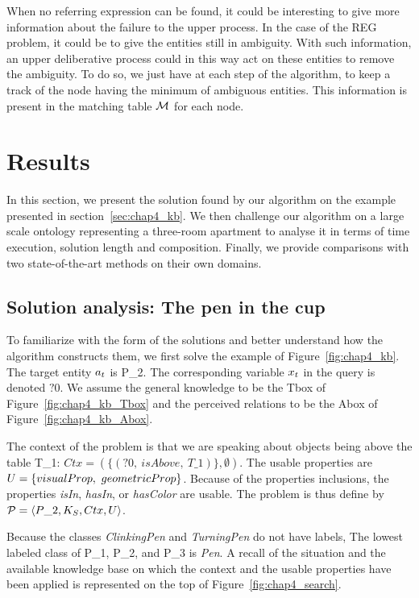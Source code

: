 When no referring expression can be found, it could be interesting to give more information about the failure to the upper process. In the case of the REG problem, it could be to give the entities still in ambiguity. With such information, an upper deliberative process could in this way act on these entities to remove the ambiguity. To do so, we just have at each step of the algorithm, to keep a track of the node having the minimum of ambiguous entities. This information is present in the matching table $\mathcal{M}$ for each node.

\section{Results}

In this section, we present the solution found by our algorithm on the example presented in section~\ref{sec:chap4_kb}. We then challenge our algorithm on a large scale ontology representing a three-room apartment to analyse it in terms of time execution, solution length and composition. Finally, we provide comparisons with two state-of-the-art methods on their own domains.

\subsection{Solution analysis: The pen in the cup}

To familiarize with the form of the solutions and better understand how the algorithm constructs them, we first solve the example of Figure~\ref{fig:chap4_kb}. The target entity $a_t$ is P\_2. The corresponding variable $x_t$ in the \sparql{} query is denoted $?0$. We assume the general knowledge to be the Tbox of Figure~\ref{fig:chap4_kb_Tbox} and the perceived relations to be the Abox of Figure~\ref{fig:chap4_kb_Abox}.

The context of the problem is that we are speaking about objects being above the table T\_1: $Ctx = (\{(?0,\ isAbove,\ T\_1)\}, \emptyset)$. The usable properties are $U = \{visualProp,\ geometricProp\}$. Because of the properties inclusions, the properties \textit{isIn}, \textit{hasIn}, or \textit{hasColor} are usable. The problem is thus define by $\mathcal{P} = \langle P\_2, K_S, Ctx, U \rangle$.

Because the classes \textit{ClinkingPen} and \textit{TurningPen} do not have labels, The lowest labeled class of P\_1, P\_2, and P\_3 is \textit{Pen}. A recall of the situation and the available knowledge base on which the context and the usable properties have been applied is represented on the top of Figure~\ref{fig:chap4_search}.

